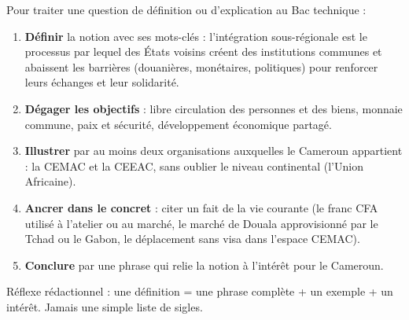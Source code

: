 \documentclass[11pt]{article}
\newcommand{\cle}[1]{{\popxbold\color{popdark}#1}}
\begin{document}
\begin{methode}
Pour traiter une question de définition ou d'explication au Bac technique :
\begin{enumerate}
\item \textbf{Définir} la notion avec ses mots-clés : l'\cle{intégration sous-régionale} est le processus par lequel des États voisins créent des institutions communes et abaissent les barrières (douanières, monétaires, politiques) pour renforcer leurs échanges et leur solidarité.
\item \textbf{Dégager les objectifs} : libre circulation des personnes et des biens, monnaie commune, paix et sécurité, développement économique partagé.
\item \textbf{Illustrer} par au moins deux organisations auxquelles le Cameroun appartient : la \cle{CEMAC} et la \cle{CEEAC}, sans oublier le niveau continental (l'\cle{Union Africaine}).
\item \textbf{Ancrer dans le concret} : citer un fait de la vie courante (le franc CFA utilisé à l'atelier ou au marché, le marché de Douala approvisionné par le Tchad ou le Gabon, le déplacement sans visa dans l'espace CEMAC).
\item \textbf{Conclure} par une phrase qui relie la notion à l'intérêt pour le Cameroun.
\end{enumerate}
Réflexe rédactionnel : une définition = une phrase complète + un exemple + un intérêt. Jamais une simple liste de sigles.
\end{methode}
\end{document}
